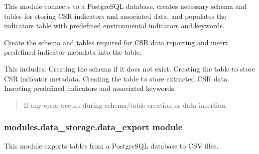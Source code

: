 \documentclass[letterpaper,10pt,english]{sphinxmanual}
\begin{document}
\sphinxAtStartPar
This module connects to a PostgreSQL database, creates necessary schema and tables
for storing CSR indicators and associated data, and populates the indicators table
with predefined environmental indicators and keywords.

\begin{fulllineitems}
\label{\detokenize{modules.data_storage:modules.data_storage.create_table.create_table_and_insert_data}}
\pysigstartsignatures
\pysiglinewithargsret
{}
{}
{}
\pysigstopsignatures
\sphinxAtStartPar
Create the schema and tables required for CSR data reporting and
insert predefined indicator metadata into the  table.

\sphinxAtStartPar
This includes:
\sphinxhyphen{} Creating the  schema if it does not exist.
\sphinxhyphen{} Creating the  table to store CSR indicator metadata.
\sphinxhyphen{} Creating the  table to store extracted CSR data.
\sphinxhyphen{} Inserting predefined indicators and associated keywords.
\begin{quote}\begin{description}
\sphinxAtStartPar
{} \textendash{} If any error occurs during schema/table creation or data insertion.

\end{description}\end{quote}

\end{fulllineitems}



\subsubsection{modules.data\_storage.data\_export module}
\label{\detokenize{modules.data_storage:module-modules.data_storage.data_export}}\label{\detokenize{modules.data_storage:modules-data-storage-data-export-module}}
\sphinxAtStartPar
This module exports tables from a PostgreSQL database to CSV files.
\end{document}
